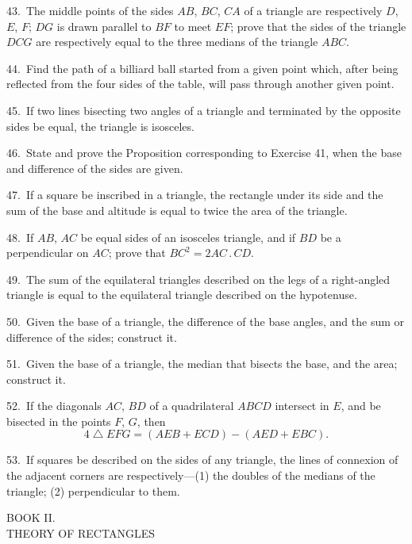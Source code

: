 \documentclass[oneside]{book}
\newcommand{\ibksp}{\hspace{-1.5em}}
\begin{document}
\begin{footnotesize}
43.~The middle points of the sides $AB$, $BC$, $CA$ of a triangle
are respectively $D$, $E$, $F$; $DG$ is drawn parallel to $BF$ to meet
$EF$; prove that the sides of the triangle $DCG$ are respectively
equal to the three medians of the triangle $ABC$.

44.~Find the path of a billiard ball started from a given point
which, after being reflected from the four sides of the table, will
pass through another given point.

45.~If two lines bisecting two angles of a triangle and terminated
by the opposite sides be equal, the triangle is isosceles.

46.~State and prove the Proposition corresponding to Exercise
41, when the base and difference of the sides are given.

47.~If a square be inscribed in a triangle, the rectangle under
its side and the sum of the base and altitude is equal to twice the
area of the triangle.

48.~If $AB$, $AC$ be equal sides of an isosceles triangle, and if
$BD$ be a perpendicular on $AC$; prove that $BC^2 = 2AC\,.\,CD$.

49.~The sum of the equilateral triangles described on the legs
of a right-angled triangle is equal to the equilateral triangle described
on the hypotenuse.

50.~Given the base of a triangle, the difference of the base
angles, and the sum or difference of the sides; construct it.

51.~Given the base of a triangle, the median that bisects the
base, and the area; construct it.

52.~If the diagonals $AC$, $BD$ of a quadrilateral $ABCD$ intersect
in $E$, and be bisected in the points $F$, $G$, then
\[
4 \; \triangle \; EFG = (AEB + ECD)-(AED + EBC).
\]

53.~If squares be described on the sides of any triangle, the
lines of connexion of the adjacent corners are respectively---(1) the
doubles of the medians of the triangle; (2) perpendicular to
them.
\par\end{footnotesize}



\newpage\begin{center}{\LARGE BOOK II\@.} \bigskip\\{\large \uppercase{Theory of Rectangles}}\\ \bigskip
{}
\addcontentsline{toc}{section}{\protect \ibksp\textsf{Theory of Rectangles,}}
\end{center}
\end{document}
